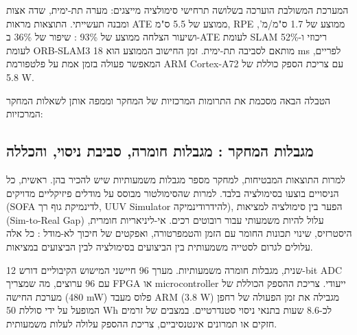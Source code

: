 המערכת המשולבת הוערכה בשלושה תרחישי סימולציה מייצגים: מערה תת-ימית, שדה אצות ומבנה תעשייתי. התוצאות מראות ATE ממוצע של 5.5 ס"מ, RPE ממוצע של 1.7 ס"מ/מ', ושיעור הצלחה ממוצע של 93\% : שיפור של 36\% ב-ATE לעומת SLAM ריכוזי ו-52\% לעומת ORB-SLAM3 מותאם לסביבה תת-ימית. זמן החישוב הממוצע הוא 18 ms לפריים, המאפשר פעולה בזמן אמת על פלטפורמת ARM Cortex-A72 עם צריכת הספק כוללת של 5.8 W.

הטבלה הבאה מסכמת את התרומות המרכזיות של המחקר וממפה אותן לשאלות המחקר המרכזיות:

\begin{table}[htbp]
\centering
\caption{סיכום התרומות המרכזיות של המחקר ומיפוי לשאלות המחקר.}
\label{tab:ch09_contributions}
\end{table}

\subsection{מגבלות המחקר : מגבלות חומרה, סביבת ניסוי, והכללה}
\label{sec:ch09_limitations}

למרות התוצאות המבטיחות, למחקר מספר מגבלות משמעותיות שיש להכיר בהן. ראשית, כל הניסויים בוצעו בסימולציה בלבד. למרות שהסימולטור מבוסס על מודלים פיזיקליים מדויקים (SOFA לדינמיקת גוף רך, UUV Simulator להידרודינמיקה), הפער בין סימולציה למציאות (Sim-to-Real Gap) עלול להיות משמעותי עבור רובוטים רכים. אי-ליניאריות חומרית, היסטרזיס, שינוי תכונות החומר עם הזמן והטמפרטורה, ואפקטים של חיכוך לא-מודל : כל אלה עלולים לגרום לסטייה משמעותית בין הביצועים בסימולציה לבין הביצועים במציאות.

שנית, מגבלות חומרה משמעותיות. מערך 96 חיישני המישוש הקיבוליים דורש 12-bit ADC עם 96 ערוצים, מה שמצריך FPGA או microcontroller ייעודי. צריכת ההספק הכוללת של מערכת החישה (480 mW) פלוס מעבד ARM (3.8 W) מגבילה את זמן הפעולה של רחפן המופעל על ידי סוללת 50 Wh לכ-8.6 שעות בתנאי ניסוי סטנדרטיים. במצבים של זרמים חזקים או תמרונים אינטנסיביים, צריכת ההספק עלולה לעלות משמעותית.

